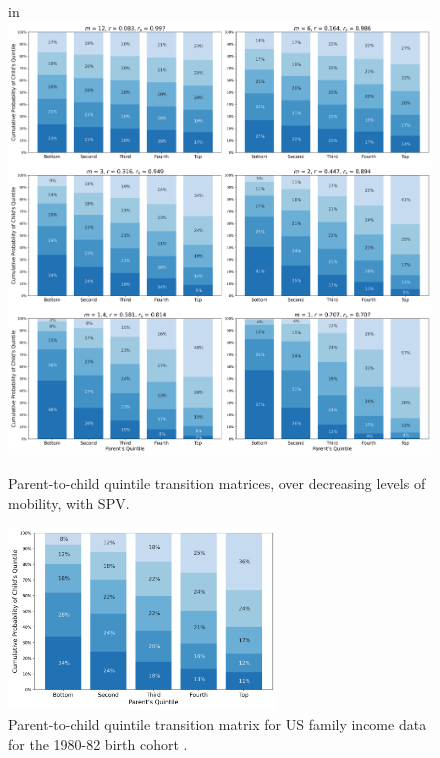 \documentclass{svproc} %
\begin{document}
\begin{figure}[H]
\centering
\advance{} in
\includegraphics[width=5.2in]{figures/quintile-mobility.png} 
\caption{Parent-to-child quintile transition matrices, over decreasing levels of mobility, with SPV.}
\label{fig:quintile_mobility}
\end{figure}



\begin{figure}[H]
\centering
\includegraphics[width=2.8in]{figures/quintile-chetty.png} 
\caption{Parent-to-child quintile transition matrix for US family income data for the 1980-82 birth cohort \cite{chetty}.}
\label{fig:quintile_chetty}
\end{figure}



\end{document}
